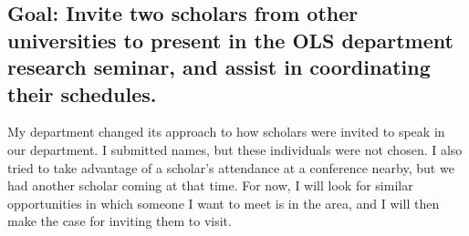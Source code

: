 \documentclass[11pt,article,oneside]{memoir}
\begin{document}
\subsection{Goal: Invite two scholars from other universities to present
in the OLS department research seminar, and assist in coordinating their
schedules.}\label{goal-invite-two-scholars-from-other-universities-to-present-in-the-ols-department-research-seminar-and-assist-in-coordinating-their-schedules.}

My department changed its approach to how scholars were invited to speak
in our department. I submitted names, but these individuals were not
chosen. I also tried to take advantage of a scholar's attendance at a
conference nearby, but we had another scholar coming at that time. For
now, I will look for similar opportunities in which someone I want to
meet is in the area, and I will then make the case for inviting them to
visit.

\hypertarget{refs}{}
\end{document}
